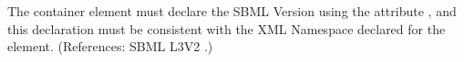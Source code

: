 The  container element must declare the SBML Version
using the attribute , and this declaration must be
consistent with the XML Namespace declared for the 
element.  (References: 
SBML L3V2 .)
